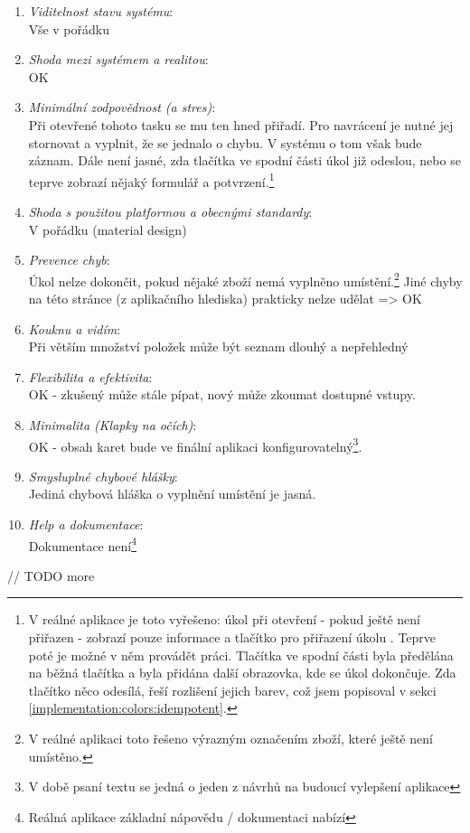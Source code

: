 \begin{enumerate}
	\item \emph{Viditelnost stavu systému}:\\Vše v pořádku
	\item \emph{Shoda mezi systémem a realitou}:\\OK
	\item \emph{Minimální zodpovědnost (a stres)}:\\Při otevřené tohoto tasku se mu ten hned přiřadí. Pro navrácení je nutné jej stornovat a vyplnit, že se jednalo o chybu. V systému o tom však bude záznam. Dále není jasné, zda tlačítka ve spodní části úkol již odeslou, nebo se teprve zobrazí nějaký formulář a potvrzení.\footnote{V reálné aplikace je toto vyřešeno: úkol při otevření - pokud ještě není přiřazen - zobrazí pouze informace a tlačítko pro přiřazení úkolu . Teprve poté je možné v něm provádět práci. Tlačítka ve spodní části byla předělána na běžná tlačítka a byla přidána další obrazovka, kde se úkol dokončuje. Zda tlačítko něco odesílá, řeší rozlišení jejich barev, což jsem popisoval v sekci \ref{implementation:colors:idempotent}.}
	\item \emph{Shoda s použitou platformou a obecnými standardy}:\\V pořádku (material design)
	\item \emph{Prevence chyb}:\\Úkol nelze dokončit, pokud nějaké zboží nemá vyplněno umístění.\footnote{V reálné aplikaci toto řešeno výrazným označením zboží, které ještě není umístěno.} Jiné chyby na této stránce (z aplikačního hlediska) prakticky nelze udělat => OK
	\item \emph{Kouknu a vidím}:\\Při větším množství položek může být seznam dlouhý a nepřehledný
	\item \emph{Flexibilita a efektivita}:\\OK - zkušený může stále pípat, nový může zkoumat dostupné vstupy.
	\item \emph{Minimalita (Klapky na očích)}:\\OK - obsah karet bude ve finální aplikaci konfigurovatelný\footnote{V době psaní textu se jedná o jeden z návrhů na budoucí vylepšení aplikace}.
	\item \emph{Smysluplné chybové hlášky}:\\Jediná chybová hláška o vyplnění umístění je jasná.
	\item \emph{Help a dokumentace}:\\Dokumentace není\footnote{Reálná aplikace základní nápovědu / dokumentaci nabízí}
\end{enumerate}

// TODO more

